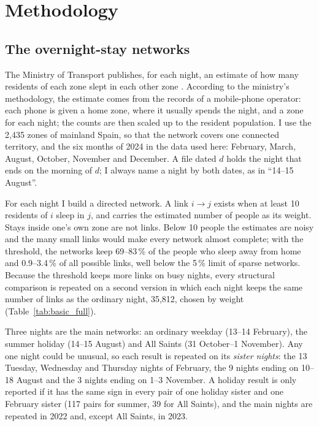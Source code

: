 \section{Methodology}\label{sec:method}

\subsection{The overnight-stay networks}

The Ministry of Transport publishes, for each night, an estimate of how many residents of each zone slept in each other zone \citep{mitms2024methodology}. According to the ministry's methodology, the estimate comes from the records of a mobile-phone operator: each phone is given a home zone, where it usually spends the night, and a zone for each night; the counts are then scaled up to the resident population. I use the 2,435 zones of mainland Spain, so that the network covers one connected territory, and the six months of 2024 in the data used here: February, March, August, October, November and December. A file dated $d$ holds the night that ends on the morning of $d$; I always name a night by both dates, as in ``14--15 August''.

For each night I build a directed network. A link $i\to j$ exists when at least 10 residents of $i$ sleep in $j$, and carries the estimated number of people as its weight. Stays inside one's own zone are not links. Below 10 people the estimates are noisy and the many small links would make every network almost complete; with the threshold, the networks keep 69--83\,\% of the people who sleep away from home and 0.9--3.4\,\% of all possible links, well below the 5\,\% limit of sparse networks. Because the threshold keeps more links on busy nights, every structural comparison is repeated on a second version in which each night keeps the same number of links as the ordinary night, 35,812, chosen by weight (Table~\ref{tab:basic_full}).

Three nights are the main networks: an ordinary weekday (13--14 February), the summer holiday (14--15 August) and All Saints (31 October--1 November). Any one night could be unusual, so each result is repeated on its \emph{sister nights}: the 13 Tuesday, Wednesday and Thursday nights of February, the 9 nights ending on 10--18 August and the 3 nights ending on 1--3 November. A holiday result is only reported if it has the same sign in every pair of one holiday sister and one February sister (117 pairs for summer, 39 for All Saints), and the main nights are repeated in 2022 and, except All Saints, in 2023.

